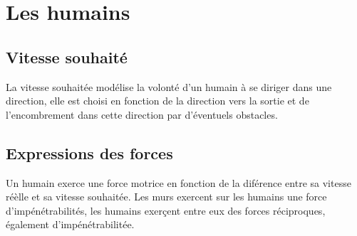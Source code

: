 \section{Les humains}
%
\label{samuel1}
\subsection{Vitesse souhaité}
La vitesse souhaitée modélise la volonté d'un humain à se diriger dans une direction, elle est choisi en fonction de la direction vers la sortie et de l'encombrement dans cette direction par d'éventuels obstacles.\cite{lemercier}
%
\subsection{Expressions des forces}
Un humain exerce une force motrice en fonction de la diférence entre sa vitesse réèlle et sa vitesse souhaitée. Les murs exercent sur les humains une force d'impénétrabilités, les humains exerçent entre eux des forces réciproques, également d'impénétrabilitée.
